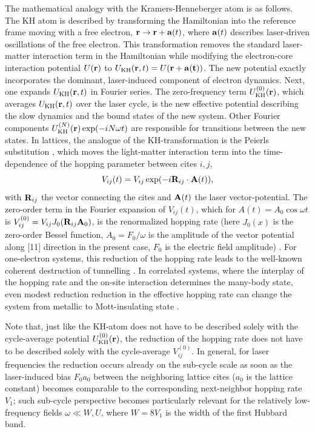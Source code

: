 \documentclass[prb,aps,twocolumn,showpacs,amsmath,amssymb]{revtex4}%
\renewcommand{\r}{\mathbf{r}}
\newcommand{\w}{\omega}
\begin{document}
The mathematical analogy with the Kramers-Henneberger atom is 
as follows. The KH atom is described by transforming the 
Hamiltonian into the reference frame moving with a free electron,
${\bf r}\rightarrow{\bf r}+{\bf a}(t)$, where ${\bf a}(t)$ describes
laser-driven oscillations of the free electron.
This transformation removes the standard laser-matter interaction 
term in the Hamiltonian while modifying the electron-core interaction potential $U(\bf r)$ to
$U_{\rm KH}(\r,t)=U(\bf r+{\bf a}(t))$.
The new potential exactly incorporates the dominant, laser-induced component of electron dynamics. Next, one expands 
$U_{\rm KH}(\r,t)$ in Fourier series.
The zero-frequency term $U^{(0)}_{\rm KH}(\r)$, 
which averages $U_{\rm KH}(\r,t)$ over the laser cycle, 
is the new effective potential describing the slow
dynamics and the 
bound states of the new system. Other 
Fourier components $U^{(N)}_{\rm KH}(\r)\exp(-iN\w t)$ are responsible
for transitions between the new states. 
In lattices,  the analogue of the KH-transformation is 
the Peierls substitution \cite{Peierls_1}, which moves 
the light-matter interaction term into the time-dependence of the 
hopping parameter between cites $i,j$,
\begin{equation}
V_{ij}(t)=V_{ij}\exp(-i{\bf R}_{ij}\cdot {\bf A}(t)),
\end{equation}
with ${\bf R}_{ij}$ the vector connecting the cites and ${\bf A}(t)$
the laser vector-potential. The zero-order term 
in the Fourier expansion of $V_{ij}(t)$, which for
$A(t)=A_0\cos\w t$ is $V^{(0)}_{ij}
=V_{ij}J_0({\bf R}_{ij} {\bf A}_0)$, is the renormalized hopping rate
(here $J_0(x)$ is the zero-order Bessel function, 
$A_0=F_0/\w$ is the amplitude of the vector potential along [11] direction in the present case, 
$F_0$ is the electric field amplitude) \cite{Dunlap1986}. 
For one-electron systems, this reduction of the 
hopping rate leads to the well-known coherent destruction of
tunnelling \cite{Dunlap1986}. In correlated
systems, where the interplay of the hopping rate and 
the on-site interaction determines the many-body state, 
even modest reduction reduction in the effective hopping rate 
can change the system from metallic to
Mott-insulating state \cite{RMP14}. 

Note that, just like the 
KH-atom does not have to be described solely with 
the cycle-average potential $U^{(0)}_{\rm KH}(\r)$, 
the reduction of the hopping rate does not have to be
described solely with 
the cycle-average $V^{(0)}_{ij}$. In general, 
for 
laser frequencies the reduction 
occurs already on the sub-cycle scale\cite{Naoto_Tsuji_2012} as soon as the laser-induced bias $F_0a_0$ between the neighboring lattice cites 
($a_0$ is the lattice constant) becomes comparable to the 
corresponding next-neighbor hopping rate $V_1$; such
sub-cycle perspective becomes particularly relevant 
for the relatively low-frequency fields 
$\w\ll W, U$, where $W=8V_1$ is the width of the 
first Hubbard band. 
\end{document}
